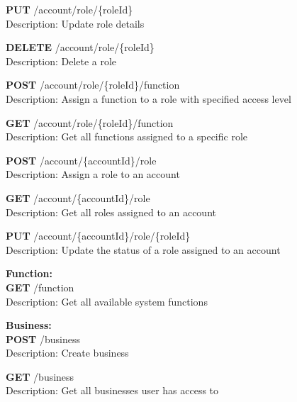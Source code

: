 \documentclass[11pt,a4paper,pdftex]{article}
\begin{document}
\hspace*{1em}\textbf{PUT} /account/role/\{roleId\}\\
\hspace*{2em}Description: Update role details

\hspace*{1em}\textbf{DELETE} /account/role/\{roleId\}\\
\hspace*{2em}Description: Delete a role

\hspace*{1em}\textbf{POST} /account/role/\{roleId\}/function\\
\hspace*{2em}Description: Assign a function to a role with specified access level

\hspace*{1em}\textbf{GET} /account/role/\{roleId\}/function\\
\hspace*{2em}Description: Get all functions assigned to a specific role

\hspace*{1em}\textbf{POST} /account/\{accountId\}/role\\
\hspace*{2em}Description: Assign a role to an account

\hspace*{1em}\textbf{GET} /account/\{accountId\}/role\\
\hspace*{2em}Description: Get all roles assigned to an account

\hspace*{1em}\textbf{PUT} /account/\{accountId\}/role/\{roleId\}\\
\hspace*{2em}Description: Update the status of a role assigned to an account

\textbf{Function:}\\
\hspace*{1em}\textbf{GET} /function\\
\hspace*{2em}Description: Get all available system functions

\textbf{Business:}\\
\hspace*{1em}\textbf{POST} /business\\
\hspace*{2em}Description: Create business

\hspace*{1em}\textbf{GET} /business\\
\hspace*{2em}Description: Get all businesses user has access to
\end{document}
